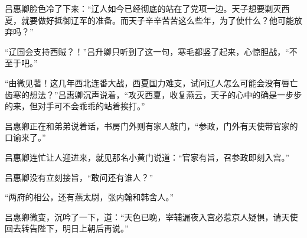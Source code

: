 吕惠卿脸色冷了下来：“辽人如今已经彻底的站在了党项一边。天子想要剿灭西夏，就要做好抵御辽军的准备。而天子辛辛苦苦这么些年，为了使什么？他可能放弃吗？”

“辽国会支持西贼？！”吕升卿只听到了这一句，寒毛都竖了起来，心惊胆战，“不至于吧。”

“由微见著！这几年西北连番大战，西夏国力难支，试问辽人怎么可能会没有唇亡齿寒的想法？”吕惠卿沉声说着，“攻灭西夏，收复燕云，天子的心中的确是一步步的来，但对手可不会乖乖的站着挨打。”

吕惠卿正在和弟弟说着话，书房门外则有家人敲门，“参政，门外有天使带官家的口谕来了。”

吕惠卿连忙让人迎进来，就见那名小黄门说道：“官家有旨，召参政即刻入宫。”

吕惠卿没有立刻接旨，“敢问还有谁人？”

“两府的相公，还有燕太尉，张内翰和韩舍人。”

吕惠卿微变，沉吟了一下，道：“天色已晚，宰辅漏夜入宫必惹京人疑惧，请天使回去转告陛下，明日上朝后再说。”

